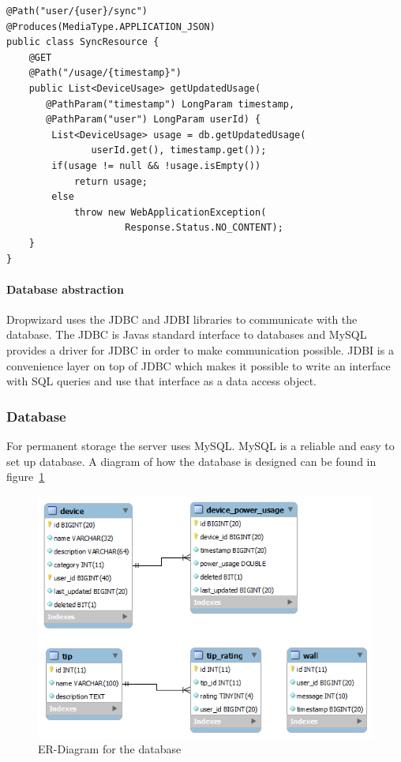 \begin{lstlisting}[caption={Dropwizard resource example}, label={lst:dropwizardResource}]
@Path("user/{user}/sync")
@Produces(MediaType.APPLICATION_JSON)
public class SyncResource {
    @GET
    @Path("/usage/{timestamp}")
    public List<DeviceUsage> getUpdatedUsage(
	   @PathParam("timestamp") LongParam timestamp, 
	   @PathParam("user") LongParam userId) {
        List<DeviceUsage> usage = db.getUpdatedUsage(
		       userId.get(), timestamp.get());
        if(usage != null && !usage.isEmpty())
            return usage;
        else
            throw new WebApplicationException(
			         Response.Status.NO_CONTENT);
    }
}
\end{lstlisting}

\paragraph{Database abstraction}
Dropwizard uses the JDBC and JDBI libraries to communicate with the database. The JDBC is Javas standard interface to databases and MySQL provides a driver for JDBC in order to make communication possible. JDBI is a convenience layer on top of JDBC which makes it possible to write an interface with SQL queries and use that interface as a data access object.

\subsubsection{Database}
For permanent storage the server uses MySQL. MySQL is a reliable and easy to set up database. A diagram of how the database is designed can be found in figure~\ref{fig:ER-Diagram}

\begin{figure}[H]
\includegraphics[width=\textwidth]{ch/architecture/fig/ER-Diagram.png}
\caption{ER-Diagram for the database}
\label{fig:ER-Diagram}
\end{figure}
